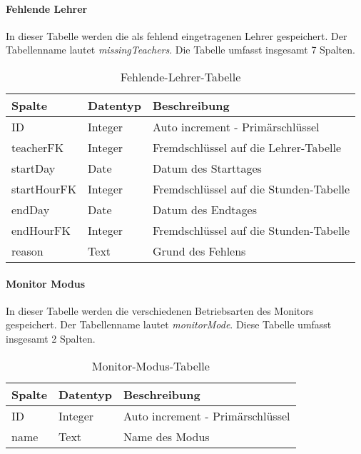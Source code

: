 \paragraph{Fehlende Lehrer\\}
In dieser Tabelle werden die als fehlend eingetragenen Lehrer gespeichert. Der Tabellenname lautet \textit{missingTeachers}. Die Tabelle umfasst insgesamt 7 Spalten.

\begin{table}[H]
\centering
\begin{tabular}{p{2.5 cm}p{2.5 cm}p{10 cm}}
   \toprule
   \textbf{Spalte} & \textbf{Datentyp} & \textbf{Beschreibung} \\
   \midrule
          ID & Integer & Auto increment - Primärschlüssel  \\
          \hline
          teacherFK & Integer & Fremdschlüssel auf die Lehrer-Tabelle   \\
          \hline
	      startDay & Date & Datum des Starttages   \\
	      \hline
          startHourFK & Integer & Fremdschlüssel auf die Stunden-Tabelle   \\
          \hline
          endDay & Date & Datum des Endtages   \\
          \hline
          endHourFK & Integer & Fremdschlüssel auf die Stunden-Tabelle   \\
          \hline
          reason & Text & Grund des Fehlens  \\
   \bottomrule
\end{tabular}
\caption{Fehlende-Lehrer-Tabelle}
\end{table}

\paragraph{Monitor Modus\\}
In dieser Tabelle werden die verschiedenen Betriebsarten des Monitors gespeichert. Der Tabellenname lautet \textit{monitorMode}. Diese Tabelle umfasst insgesamt 2 Spalten.

\begin{table}[H]
\centering
\begin{tabular}{p{2.5 cm}p{2.5 cm}p{10 cm}}
   \toprule
   \textbf{Spalte} & \textbf{Datentyp} & \textbf{Beschreibung} \\
   \midrule
          ID & Integer & Auto increment - Primärschlüssel  \\
          \hline
          name & Text & Name des Modus  \\
   \bottomrule
\end{tabular}
\caption{Monitor-Modus-Tabelle}
\end{table}

